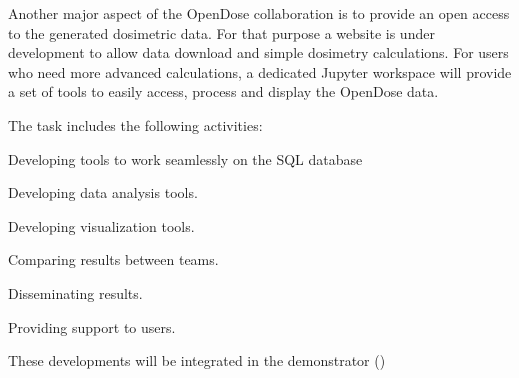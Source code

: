 \begin{task}[
  title=Nuclear Medicine application,
  id=opendose-analysis,
  lead=INSERM,
  PM=24,
  wphases={0-24},
  partners={INSERM}
]
  Another major aspect of the OpenDose collaboration is to provide an open
  access to the generated dosimetric data. For that purpose a website is under
  development to allow data download and simple dosimetry calculations. For
  users who need more advanced calculations, a dedicated Jupyter workspace will
  provide a set of tools to easily access, process and display the OpenDose
  data.

  The task includes the following activities:
  \begin{compactitem}
  \item Developing tools to work seamlessly on the SQL database
  \item Developing data analysis tools. 
  \item Developing visualization tools. 
  \item Comparing results between teams. 
  \item Disseminating results.
  \item Providing support to users.
  \end{compactitem}
  These developments will be integrated in the demonstrator
  ()





\end{task}
